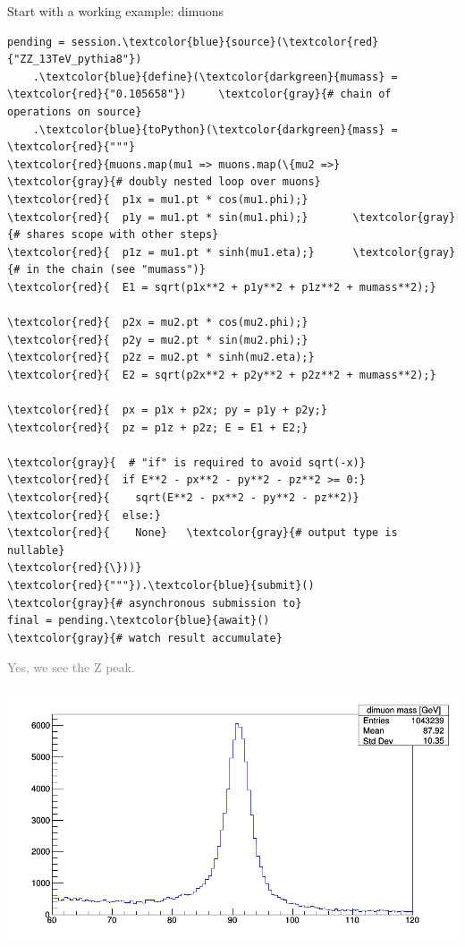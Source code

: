 \documentclass{beamer}
\begin{document}
\begin{frame}[fragile]{Start with a working example: dimuons}
\vspace{0.15 cm}
\scriptsize
\begin{Verbatim}[commandchars=\\\{\}]
pending = session.\textcolor{blue}{source}(\textcolor{red}{"ZZ_13TeV_pythia8"})
    .\textcolor{blue}{define}(\textcolor{darkgreen}{mumass} = \textcolor{red}{"0.105658"})     \textcolor{gray}{# chain of operations on source}
    .\textcolor{blue}{toPython}(\textcolor{darkgreen}{mass} = \textcolor{red}{"""}
\textcolor{red}{muons.map(mu1 => muons.map(\{mu2 =>}   \textcolor{gray}{# doubly nested loop over muons}
\textcolor{red}{  p1x = mu1.pt * cos(mu1.phi);}
\textcolor{red}{  p1y = mu1.pt * sin(mu1.phi);}       \textcolor{gray}{# shares scope with other steps}
\textcolor{red}{  p1z = mu1.pt * sinh(mu1.eta);}      \textcolor{gray}{# in the chain (see "mumass")}
\textcolor{red}{  E1 = sqrt(p1x**2 + p1y**2 + p1z**2 + mumass**2);}

\textcolor{red}{  p2x = mu2.pt * cos(mu2.phi);}
\textcolor{red}{  p2y = mu2.pt * sin(mu2.phi);}
\textcolor{red}{  p2z = mu2.pt * sinh(mu2.eta);}
\textcolor{red}{  E2 = sqrt(p2x**2 + p2y**2 + p2z**2 + mumass**2);}

\textcolor{red}{  px = p1x + p2x; py = p1y + p2y;}
\textcolor{red}{  pz = p1z + p2z; E = E1 + E2;}

\textcolor{gray}{  # "if" is required to avoid sqrt(-x)}
\textcolor{red}{  if E**2 - px**2 - py**2 - pz**2 >= 0:}
\textcolor{red}{    sqrt(E**2 - px**2 - py**2 - pz**2)}
\textcolor{red}{  else:}
\textcolor{red}{    None}   \textcolor{gray}{# output type is nullable}
\textcolor{red}{\}))}
\textcolor{red}{"""}).\textcolor{blue}{submit}()                        \textcolor{gray}{# asynchronous submission to}
final = pending.\textcolor{blue}{await}()              \textcolor{gray}{# watch result accumulate}
\end{Verbatim}

\vspace{-4 cm}
\hfill \textcolor{gray}{Yes, we see the Z peak.\hspace{0.25 cm}}

\vspace{-0.2 cm}
\hfill \mbox{\includegraphics[width=0.48\linewidth]{c1.png}\hspace{-1 cm}}
\vspace{4 cm}
\end{frame}
\end{document}
